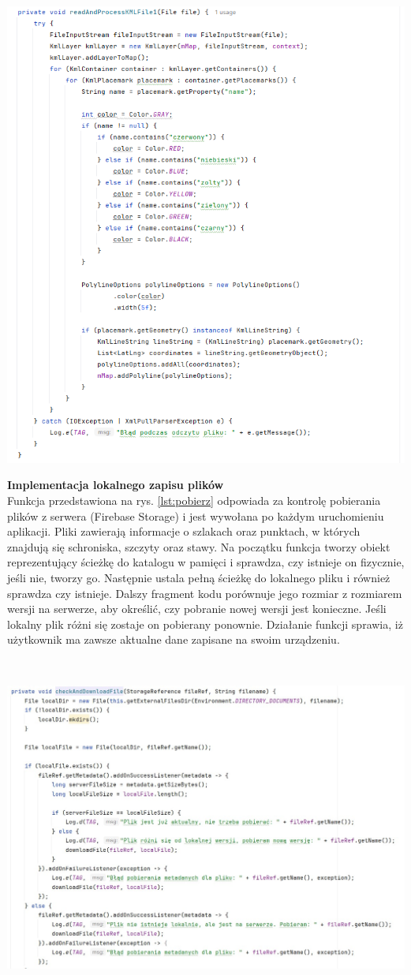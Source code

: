 \noindent
\setlength{\fboxrule}{0.5pt}
\begin{minipage}{\linewidth}
    \label{lst:rysowanie}
    \centering
    \includegraphics[width=0.6\linewidth]{img/kod/rysowanie-szlakow.png}
\end{minipage}



\textbf{Implementacja lokalnego zapisu plików} \\ 
Funkcja przedstawiona na rys. \ref{lst:pobierz} odpowiada za kontrolę pobierania plików z serwera (Firebase Storage) i jest wywołana po każdym uruchomieniu aplikacji. Pliki zawierają informacje o szlakach oraz punktach, w których znajdują się schroniska, szczyty oraz stawy. Na początku funkcja tworzy obiekt reprezentujący ścieżkę do katalogu w pamięci i sprawdza, czy istnieje on fizycznie, jeśli nie, tworzy go. Następnie ustala pełną ścieżkę do lokalnego pliku i również sprawdza czy istnieje. Dalszy fragment kodu porównuje jego rozmiar z rozmiarem wersji na serwerze, aby określić, czy pobranie nowej wersji jest konieczne. Jeśli lokalny plik różni się zostaje on pobierany ponownie. Działanie funkcji sprawia, iż użytkownik ma zawsze aktualne dane zapisane na swoim urządzeniu. 

\\

\noindent
\setlength{\fboxrule}{0.5pt}
\begin{minipage}{\linewidth}
    \label{lst:pobierz}
    \centering
    \includegraphics[width=0.6\linewidth]{img/kod/imp-ckeckandadd.jpg}
\end{minipage}\\

